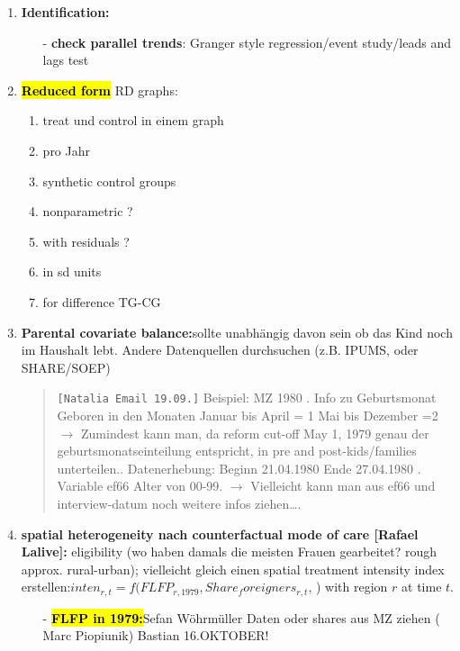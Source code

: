 \documentclass[11pt,a4paper]{article}
\begin{document}
{\begin{enumerate}
\item \textbf{Identification:}\vspace{-1em}
\begin{itemize}
	\item[-]\textbf{check parallel trends}: Granger style regression/event study/leads and lags test
\end{itemize}


\item \textbf{\hl{Reduced form}}\newline 
RD graphs:\vspace{-1em}
\begin{enumerate}
	\item treat und control in einem graph
	\item pro Jahr
	\item synthetic control groups
	\item nonparametric ? 
	\item with residuals ? 
	\item in sd units 
	\item for difference TG-CG
\end{enumerate}


\item \textbf{Parental covariate balance:}\newline sollte unabhängig davon sein ob das Kind noch im Haushalt lebt. Andere Datenquellen durchsuchen (z.B. IPUMS, oder SHARE/SOEP)
\begin{quote}
	\texttt{[Natalia Email 19.09.]}\newline
	Beispiel: MZ 1980 .	Info zu Geburtsmonat   Geboren in den Monaten
	Januar bis April = 1
	Mai bis Dezember  =2 \newline
	$\rightarrow$	Zumindest kann man, da reform cut-off May 1, 1979 genau der 	geburtsmonatseinteilung entspricht, in pre and post-kids/families unterteilen..	Datenerhebung: 
	Beginn 21.04.1980 
	Ende 27.04.1980 . Variable ef66 Alter von 00-99.\newline
	$\rightarrow$	Vielleicht kann man aus ef66 und interview-datum noch weitere infos ziehen….
\end{quote}


\item  \textbf{spatial heterogeneity nach counterfactual mode of care [Rafael Lalive]:} \newline eligibility (wo haben damals die meisten Frauen gearbeitet? rough approx. rural-urban); vielleicht gleich einen spatial treatment intensity index erstellen:\newline $inten_{r,t}=f(FLFP_{r,1979}, Share_foreigners_{r,t}$, ) \newline
with region $r$ at time $t$. 
\begin{itemize}
	\item[-] \textbf{\hl{FLFP in 1979:}}\newline Sefan Wöhrmüller Daten oder shares aus MZ ziehen (	Marc Piopiunik) Bastian 16.OKTOBER!
\end{itemize}



\end{enumerate}}
\end{document}
